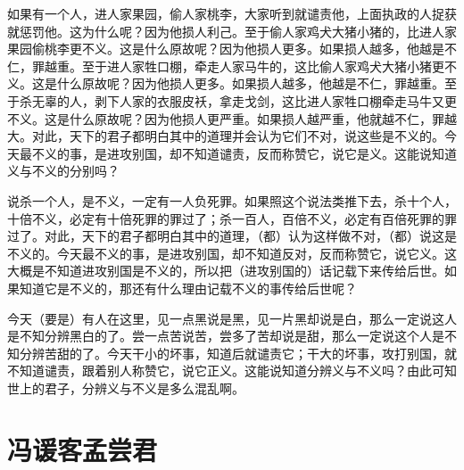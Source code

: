 \documentclass[12pt,UTF-8,openany,a4]{ctexbook}
\begin{document}
\begin{large}
    \yiwen 
    如果有一个人，进人家果园，偷人家桃李，大家听到就谴责他，上面执政的人捉获就惩罚他。这为什么呢？因为他损人利己。至于偷人家鸡犬大猪小猪的，比进人家果园偷桃李更不义。这是什么原故呢？因为他损人更多。如果损人越多，他越是不仁，罪越重。至于进人家牲口棚，牵走人家马牛的，这比偷人家鸡犬大猪小猪更不义。这是什么原故呢？因为他损人更多。如果损人越多，他越是不仁，罪越重。至于杀无辜的人，剥下人家的衣服皮袄，拿走戈剑，这比进人家牲口棚牵走马牛又更不义。这是什么原故呢？因为他损人更严重。如果损人越严重，他就越不仁，罪越大。对此，天下的君子都明白其中的道理并会认为它们不对，说这些是不义的。今天最不义的事，是进攻别国，却不知道谴责，反而称赞它，说它是义。这能说知道义与不义的分别吗？
    
    说杀一个人，是不义，一定有一人负死罪。如果照这个说法类推下去，杀十个人，十倍不义，必定有十倍死罪的罪过了；杀一百人，百倍不义，必定有百倍死罪的罪过了。对此，天下的君子都明白其中的道理，（都）认为这样做不对，（都）说这是不义的。今天最不义的事，是进攻别国，却不知道反对，反而称赞它，说它义。这大概是不知道进攻别国是不义的，所以把（进攻别国的）话记载下来传给后世。如果知道它是不义的，那还有什么理由记载不义的事传给后世呢？
    
    今天（要是）有人在这里，见一点黑说是黑，见一片黑却说是白，那么一定说这人是不知分辨黑白的了。尝一点苦说苦，尝多了苦却说是甜，那么一定说这个人是不知分辨苦甜的了。今天干小的坏事，知道后就谴责它；干大的坏事，攻打别国，就不知道谴责，跟着别人称赞它，说它正义。这能说知道分辨义与不义吗？由此可知世上的君子，分辨义与不义是多么混乱啊。
    
\end{large}



\chapter{冯谖客孟尝君}
\end{document}
